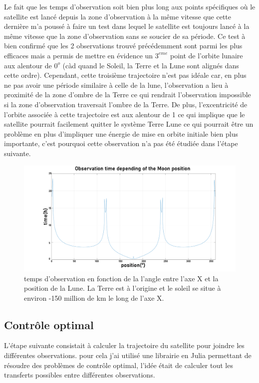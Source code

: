 \documentclass[11pt]{article} %
\begin{document}
		Le fait que les temps d'observation soit bien plus long aux points spécifiques où le satellite est lancé depuis la zone d'observation à la même vitesse que cette dernière m'a poussé à faire un test dans lequel le satellite est toujours lancé à la même vitesse que la zone d'observation sans se soucier de sa période. Ce test à bien confirmé que les 2 observations trouvé précédemment sont parmi les plus efficaces mais a permis de mettre en évidence un $3^{eme}$ point de l'orbite lunaire aux alentour de $0^o$ (càd quand le Soleil, la Terre et la Lune sont alignés dans cette ordre). Cependant, cette troisième trajectoire n'est pas idéale car, en plus ne pas avoir une période similaire à celle de la lune, l'observation a lieu à proximité de la zone d'ombre de la Terre ce qui rendrait l'observation impossible si la zone d'observation traversait l'ombre de la Terre. De plus, l'excentricité de l'orbite associée à cette trajectoire est aux alentour de 1 ce qui implique que le satellite pourrait facilement quitter le système Terre Lune ce qui pourrait être un problème en plus d'impliquer une énergie de mise en orbite initiale bien plus importante, c'est pourquoi cette observation n'a pas été étudiée dans l'étape suivante.
		\begin{figure}[h]
			\includegraphics[width=1\textwidth]{images/observation_Obs.png}
			\caption{temps d'observation en fonction de la l'angle entre l'axe X et la position de la Lune. La Terre est à l'origine et le soleil se situe à environ -150 million de km le long de l'axe X.}
		\end{figure}
		
		
		\subsection{Contrôle optimal}
		
		L'étape suivante consistait à calculer la trajectoire du satellite pour joindre les différentes observations.
		pour cela j'ai utilisé une librairie en Julia permettant de résoudre des problèmes de contrôle optimal, l'idée était de calculer tout les transferts possibles entre différentes observations.
		
\end{document}
